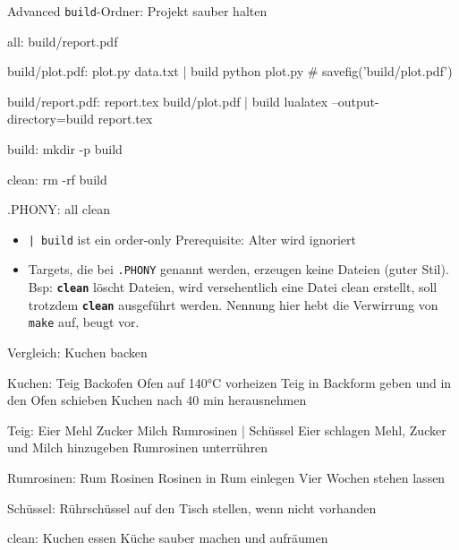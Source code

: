 \begin{frame}[fragile]{Advanced}
  \texttt{build}-Ordner: Projekt sauber halten

  \begin{center}
    \begin{lstmake}
      all: build/report.pdf

      build/plot.pdf: plot.py data.txt | build
          python plot.py  # savefig('build/plot.pdf')

      build/report.pdf: report.tex build/plot.pdf | build
          lualatex --output-directory=build report.tex

      build:
          mkdir -p build

      clean:
          rm -rf build

      .PHONY: all clean
    \end{lstmake}
  \end{center}

  \begin{itemize}
    \item \texttt{| build} ist ein order-only Prerequisite: Alter wird ignoriert
    \item Targets, die bei \texttt{.PHONY} genannt werden, erzeugen keine Dateien (guter Stil).
        Bsp: \textbf{\texttt{clean}} löscht Dateien, wird versehentlich eine Datei clean erstellt,
        soll trotzdem \textbf{\texttt{clean}} ausgeführt werden.
        Nennung hier hebt die Verwirrung von \texttt{make} auf, beugt vor.
  \end{itemize}
\end{frame}

\begin{frame}[fragile]{Vergleich: Kuchen backen}
  \begin{center}
    \begin{lstmake}
    Kuchen: Teig Backofen
        Ofen auf 140°C vorheizen
        Teig in Backform geben und in den Ofen schieben
        Kuchen nach 40 min herausnehmen

    Teig: Eier Mehl Zucker Milch Rumrosinen | Schüssel
        Eier schlagen
        Mehl, Zucker und Milch hinzugeben
        Rumrosinen unterrühren

    Rumrosinen: Rum Rosinen
        Rosinen in Rum einlegen
        Vier Wochen stehen lassen

    Schüssel:
        Rührschüssel auf den Tisch stellen, wenn nicht vorhanden

    clean:
        Kuchen essen
        Küche sauber machen und aufräumen
    \end{lstmake}
  \end{center}
\end{frame}

